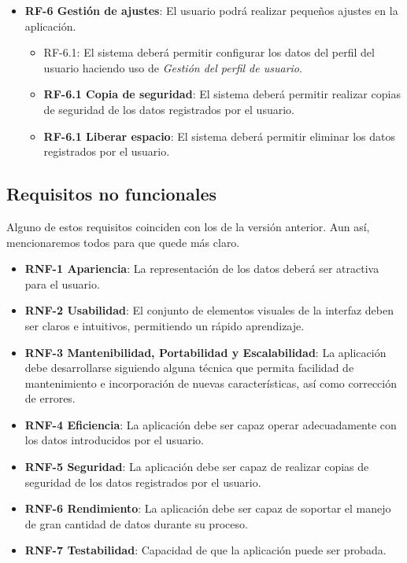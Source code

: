 \begin{itemize}
\begin{itemize}
\begin{itemize}
				\end{itemize}
		\end{itemize}
	\item \textbf{RF-6 Gestión de ajustes}: El usuario podrá realizar pequeños ajustes en la aplicación.
		\begin{itemize}
			\item RF-6.1: El sistema deberá permitir configurar los datos del perfil del usuario haciendo uso de \textit{Gestión del perfil de usuario}.
			\item \textbf{RF-6.1 Copia de seguridad}: El sistema deberá permitir realizar copias de seguridad de los datos registrados por el usuario.
			\item \textbf{RF-6.1 Liberar espacio}: El sistema deberá permitir eliminar los datos registrados por el usuario.
		\end{itemize}
\end{itemize}
\subsection{Requisitos no funcionales}
Alguno de estos requisitos coinciden con los de la versión anterior. Aun así, mencionaremos todos para que quede más claro.
\begin{itemize}
	\item \textbf{RNF-1 Apariencia}: La representación de los datos deberá ser atractiva para el usuario.
	\item \textbf{RNF-2 Usabilidad}: El conjunto de elementos visuales de la interfaz deben ser claros e intuitivos, permitiendo un rápido aprendizaje.
	\item \textbf{RNF-3  Mantenibilidad, Portabilidad y Escalabilidad}: La aplicación debe desarrollarse siguiendo alguna técnica que permita facilidad de mantenimiento e incorporación de nuevas características, así como corrección de errores.
	\item \textbf{RNF-4 Eficiencia}: La aplicación debe ser capaz operar adecuadamente con los datos introducidos por el usuario.
	\item \textbf{RNF-5 Seguridad}: La aplicación debe ser capaz de realizar copias de seguridad de los datos registrados por el usuario.
	\item \textbf{RNF-6 Rendimiento}: La aplicación debe ser capaz de soportar el manejo de gran cantidad de datos durante su proceso.
	\item \textbf{RNF-7 Testabilidad}: Capacidad de que la aplicación puede ser probada.
\end{itemize}
